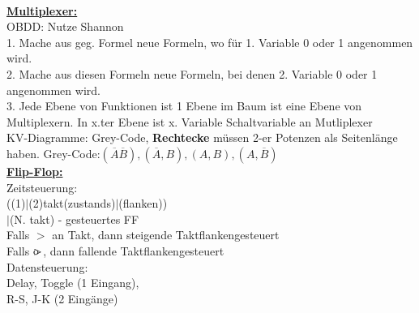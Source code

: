 \documentclass[11pt]{article}
\begin{document}
~~~~~~~
\begin{minipage}{0.33\textwidth}
\vspace{-8.5cm}

\underline{\textbf{Multiplexer:}}\\
OBDD: Nutze Shannon\\
1. Mache aus geg. Formel neue Formeln, wo für 1. Variable 0 oder 1 angenommen wird.\\
2. Mache aus diesen Formeln neue Formeln, bei denen 2. Variable 0 oder 1 angenommen wird.\\
3. Jede Ebene von Funktionen ist 1 Ebene im Baum ist eine Ebene von Multiplexern. In x.ter Ebene ist x. Variable Schaltvariable an Mutliplexer\\
KV-Diagramme: Grey-Code, \textbf{Rechtecke} müssen 2-er Potenzen als Seitenlänge haben.
Grey-Code:$(\overline{A} \overline{B}), (\overline{A}, B), (A,B), (A, \overline{B})$\\

\vspace{3cm}
\underline{\textbf{Flip-Flop:}}\\
Zeitsteuerung:\\ ((1)$|$(2)takt(zustands)$|$(flanken))\\$|$(N. takt) - gesteuertes FF\\
Falls $>$ an Takt, dann steigende Taktflankengesteuert\\
Falls $\rlap{o}{>}$, dann fallende Taktflankengesteuert\\
Datensteuerung:\\ Delay, Toggle (1 Eingang), \\R-S, J-K (2 Eingänge)

\end{minipage}
~~~~~~~
\end{document}
